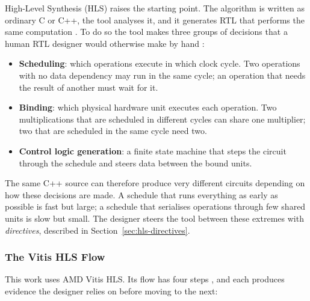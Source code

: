 \documentclass[12pt,a4paper]{article}
\begin{document}
High-Level Synthesis (HLS) raises the starting point. The
algorithm is written as ordinary C or C++, the tool analyses it,
and it generates RTL that performs the same computation
\citep{hls_academy_101}. To do so the tool makes three groups of
decisions that a human RTL designer would otherwise make by hand
\citep{amd_ug1399}:

\begin{itemize}
  \item \textbf{Scheduling}: which operations execute in which
        clock cycle. Two operations with no data dependency may run
        in the same cycle; an operation that needs the result of
        another must wait for it.
  \item \textbf{Binding}: which physical hardware unit executes
        each operation. Two multiplications that are scheduled in
        different cycles can share one multiplier; two that are
        scheduled in the same cycle need two.
  \item \textbf{Control logic generation}: a finite state machine
        that steps the circuit through the schedule and steers data
        between the bound units.
\end{itemize}

The same C++ source can therefore produce very different circuits
depending on how these decisions are made. A schedule that runs
everything as early as possible is fast but large; a schedule that
serialises operations through few shared units is slow but small.
The designer steers the tool between these extremes with
\emph{directives}, described in Section~\ref{sec:hls-directives}.

\subsubsection{The Vitis HLS Flow}
\label{sec:hls-flow}

This work uses AMD Vitis HLS. Its flow has four steps
\citep{amd_ug1399}, and each produces evidence the designer relies
on before moving to the next:
\end{document}
